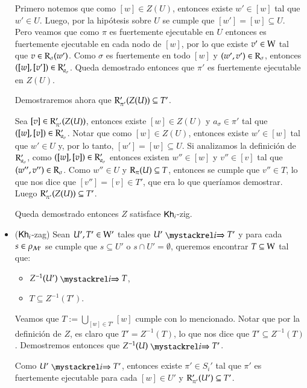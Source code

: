 \begin{demostracion}
\begin{itemize}
        Primero notemos que como $[w] \in Z(U)$, entonces existe $w' \in [w]$ tal que $w' \in U$. Luego, por la hipótesis sobre $U$
        se cumple que $[w'] = [w] \subseteq U$. Pero veamos que como $\pi$ es fuertemente ejecutable en $U$ entonces es fuertemente ejecutable en cada nodo 
        de $[w]$, por lo que existe $v' \in \mathrm{W}$ tal que $v \in \mathrm{R}_\sigma(w')$. Como $\sigma$ es fuertemente en todo $[w]$ y $(w',v') \in \mathrm{R}_\sigma$, entonces 
        $([w],[v']) \in \mathrm{R}'_{a_\sigma}$. Queda demostrado entonces que $\pi'$ es fuertemente ejecutable en $Z(U)$.
        
        Demostraremos ahora que $\mathrm{R}'_{\pi'}(Z(U)) \subseteq T'$.

        Sea $[v] \in \mathrm{R}'_{\pi'}(Z(U))$, entonces existe $[w] \in Z(U)$ y $a_\sigma \in \pi'$ tal que $([w],[v]) \in \mathrm{R}'_{a_\sigma}$. Notar que 
        como $[w] \in Z(U)$, entonces existe $w' \in [w]$ tal que $w' \in U$ y, por lo tanto, $[w'] = [w] \subseteq U$. Si analizamos la definición 
        de $\mathrm{R}'_{a_\sigma}$, como $([w],[v]) \in \mathrm{R}'_{a_\sigma}$ entonces existen $w'' \in [w]$ y $v'' \in [v]$ tal que $(w'',v'') \in \mathrm{R}_\sigma$.
        Como $w'' \in U$ y $\mathrm{R}_\pi(U) \subseteq T$, entonces se cumple que $v'' \in T$, lo que nos dice que $[v''] = [v] \in T'$, que era lo que 
        queríamos demostrar. Luego $\mathrm{R}'_{\pi'}(Z(U)) \subseteq T'$. 

        Queda demostrado entonces $Z$ satisface $\mathsf{Kh}_i$-zig.

        \item ($\mathsf{Kh}_i$-zag) Sean $U', T' \in \mathrm{W}'$ tales que $U' \ultsExecAgi T'$ y para cada $s \in \rho_{\mathcal{M}'}$ se cumple que $s \subseteq U'$ o 
        $s \cap U' = \emptyset$, queremos encontrar $T \subseteq \mathrm{W}$ tal que:
        \begin{multicols}{2}
            \begin{itemize}
                \item $Z^{-1}(U') \ultsExecAgi T$, 
                \item $T \subseteq Z^{-1}(T')$.
            \end{itemize}
        \end{multicols}
        
        Veamos que $T := \bigcup\limits_{[w] \in T'} [w]$ cumple con lo mencionado. Notar que por la definición de $Z$, es claro que $T' = Z^{-1}(T)$, lo que nos dice que $T' \subseteq Z^{-1}(T)$. Demostremos entonces que $Z^{-1}(U) \ultsExecAgi T'$. 
    
        Como $U' \ultsExecAgi T'$, entonces existe $\pi' \in S_i'$ tal que $\pi'$ es fuertemente ejecutable para cada $[w] \in U'$ y $\mathrm{R}'_{\pi'}(U') \subseteq T'$.


\end{itemize}
\end{demostracion}
